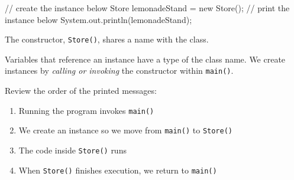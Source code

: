 \documentclass[a4paper,12pt]{article}
\begin{document}
\begin{enumerate}
\begin{javacode}
{{    // create the instance below
    Store lemonadeStand = new Store();
    // print the instance below
    System.out.println(lemonadeStand);
  }
}
\end{javacode}
The constructor, \verb|Store()|, shares a name with the class. 

Variables that reference an instance have a type of the class name. We create instances by \textit{calling or invoking} the constructor within \verb|main()|.

Review the order of the printed messages:
\renewcommand{\labelenumii}{$\diamond$}
\begin{enumerate}
\item Running the program invokes \verb|main()|

\item We create an instance so we move from \verb|main()| to \verb|Store()|

\item The code inside \verb|Store()| runs

\item When \verb|Store()| finishes execution, we return to \verb|main()|

\end{enumerate}


\end{enumerate}



\end{document}
